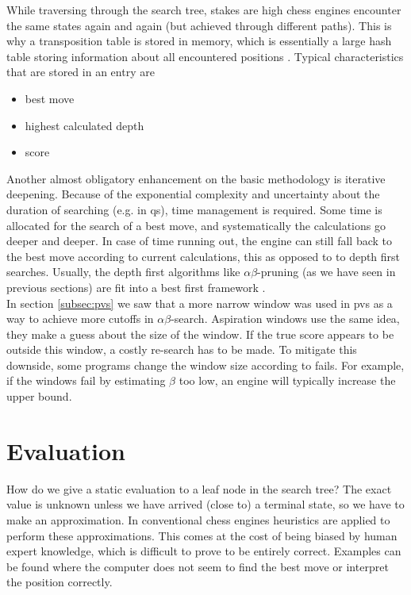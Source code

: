 While traversing through the search tree, stakes are high chess engines encounter the same states again and again (but achieved through different paths). This is why a transposition table is stored in memory, which is essentially a large hash table storing information about all encountered positions \cite{kishimoto02}. Typical characteristics that are stored in an entry are
\begin{itemize}
\item best move
\item highest calculated depth
\item score
\end{itemize}

Another almost obligatory enhancement on the basic methodology is iterative deepening. Because of the exponential complexity and uncertainty about the duration of searching (e.g. in \gls{qs}), time management is required. Some time is allocated for the search of a best move, and systematically the calculations go deeper and deeper. In case of time running out, the engine can still fall back to the best move according to current calculations, this as opposed to to depth first searches. Usually, the depth first algorithms like $\alpha \beta$-pruning (as we have seen in previous sections) are fit into a best first framework \cite{korf85,reine94}. \\

In section \ref{subsec:pvs} we saw that a more narrow window was used in \gls{pvs} as a way to achieve more cutoffs in $\alpha \beta$-search. Aspiration windows use the same idea, they make a guess about the size of the window. If the true score appears to be outside this window, a costly re-search has to be made. To mitigate this downside, some programs change the window size according to fails. For example, if the windows fail by estimating $\beta$ too low, an engine will typically increase the upper bound.

\section{Evaluation}
\label{sec:evaluation}
How do we give a static evaluation to a leaf node in the search tree? The exact value is unknown unless we have arrived (close to) a terminal state, so we have to make an approximation. In conventional chess engines heuristics are applied to perform these approximations. This comes at the cost of being biased by human expert knowledge, which is difficult to prove to be entirely correct. Examples can be found where the computer does not seem to find the best move or interpret the position correctly. \\

